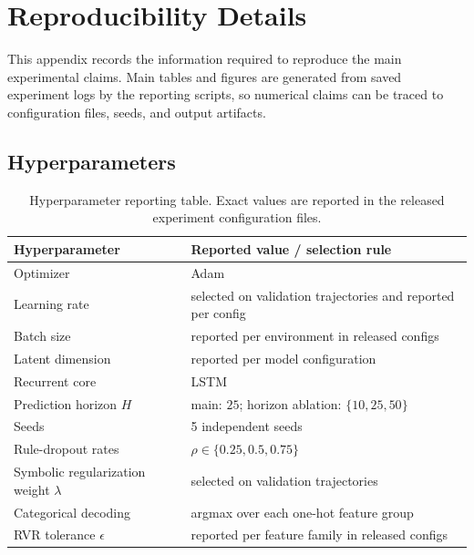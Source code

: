 \documentclass{article}
\theoremstyle{plain}
\theoremstyle{definition}
\theoremstyle{remark}
\begin{document}

\appendix

\section{Reproducibility Details}
\label{app:reproducibility}

This appendix records the information required to reproduce the main experimental claims. Main tables and figures are generated from saved experiment logs by the reporting scripts, so numerical claims can be traced to configuration files, seeds, and output artifacts.

\subsection{Hyperparameters}
\label{app:hyperparameters}

\begin{table}[h]
  \centering
  \footnotesize
  \begin{tabular}{ll}
    \toprule
    \textbf{Hyperparameter}                  & \textbf{Reported value / selection rule}                    \\
    \midrule
    Optimizer                                & Adam                                                        \\
    Learning rate                            & selected on validation trajectories and reported per config \\
    Batch size                               & reported per environment in released configs                \\
    Latent dimension                         & reported per model configuration                            \\
    Recurrent core                           & LSTM                                                        \\
    Prediction horizon $H$                   & main: $25$; horizon ablation: $\{10,25,50\}$                \\
    Seeds                                    & 5 independent seeds                                         \\
    Rule-dropout rates                       & $\rho \in \{0.25,0.5,0.75\}$                                \\
    Symbolic regularization weight $\lambda$ & selected on validation trajectories                         \\
    Categorical decoding                     & argmax over each one-hot feature group                      \\
    RVR tolerance $\epsilon$                 & reported per feature family in released configs             \\
    \bottomrule
  \end{tabular}
  \caption{Hyperparameter reporting table. Exact values are reported in the released experiment configuration files.}
  \label{tab:hyperparameter_template}
\end{table}
\end{document}
